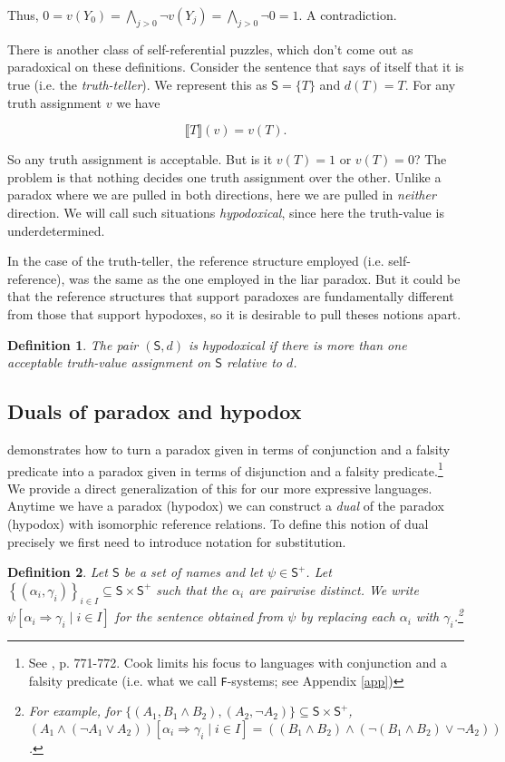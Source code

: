 \documentclass[12pt]{article}
\newtheorem{defn}{Definition}
\theoremstyle{remark}
\newcommand{\prg}{\hspace{0.25in}}
\def\S{\textsf{S}}
\begin{document}
Thus, $0 = v(Y_0) = \bigwedge_{j > 0} \neg v(Y_j)= \bigwedge_{j > 0} \neg 0 = 1$.  A contradiction. 

\prg There is another class of self-referential puzzles, which don't come out as paradoxical on these definitions. Consider the sentence that says of itself that it is true (i.e. the \textit{truth-teller}). We represent this as $\S = \{T\}$ and $d(T) = T$. For any truth assignment $v$ we have
 
\[ \llbracket T \rrbracket(v) = v(T).\]

So any truth assignment is acceptable. But is it $v(T) = 1$ or $v(T) =0$? The problem is that nothing decides one truth assignment over the other. Unlike a paradox where we are pulled in both directions, here we are pulled in \textit{neither} direction. We will call such situations \textit{hypodoxical}, since here the truth-value is underdetermined.

\prg In the case of the truth-teller, the reference structure employed (i.e. self-reference), was the same as the one employed in the liar paradox. But it could be that the reference structures that support paradoxes are fundamentally different from those that support hypodoxes, so it is desirable to pull theses notions apart. 

\begin{defn}
The pair $(\S, d)$ is \emph{hypodoxical} if there is more than one acceptable truth-value assignment on $\S$ relative to $d$.
\end{defn}

\subsection{Duals of paradox and hypodox}

\cite{cook} demonstrates how to turn a paradox given in terms of conjunction and a falsity predicate into a paradox given in terms of disjunction and a falsity predicate.\footnote{See \cite{cook}, p. 771-772. Cook limits his focus to languages with conjunction and a falsity predicate (i.e. what we call \texttt{F}-systems; see Appendix \ref{app})} We provide a direct generalization of this for our more expressive languages. Anytime we have a paradox (hypodox) we can construct a \textit{dual} of the paradox (hypodox) with isomorphic reference relations.  To define this notion of dual precisely we first need to introduce notation for substitution.

\begin{defn}
Let $\S$ be a set of names and let $\psi \in \S^+$. Let $\left\{ (\alpha_i, \gamma_i)\right\}_{i \in I} \subseteq \S \times \S^+$ such that the $\alpha_i$ are pairwise distinct. We write $\psi\left[\alpha_i \Rightarrow \gamma_i \mid i \in I\right]$ for the sentence obtained from $\psi$ by replacing each $\alpha_i$ with $\gamma_i$.\footnote{For example, for $\{(A_1, B_1 \wedge B_2), ( A_2, \neg A_2) \} \subseteq \S \times \S^+$, $(A_1 \wedge (\neg A_1 \vee A_2))\left[\alpha_i \Rightarrow \gamma_i \mid i \in I\right] = ((B_1 \wedge B_2) \wedge (\neg (B_1 \wedge B_2) \vee \neg A_2))$.}
\end{defn}
\end{document}
